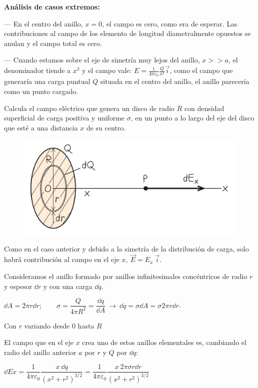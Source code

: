  \textbf{Análisis de casos extremos:}
 
 --- En el centro del anillo, $x=0$, el campo es cero, como era de esperar. Las contribuciones al campo de los elemento de longitud diametralmente opuestos se anulan y el campo total es cero.
 
 --- Cuando estamos sobre el eje de simetría muy lejos del anillo, $x>>a$, el denominador tiende a $x^3$ y el campo vale: 
 $E= \frac{1}{4\pi \varepsilon_0} \frac Q {x^2}\vec i$,
 como el campo que generaría una carga puntual $Q$ situada en el centro del anillo, el anillo parecería como un punto cargado.

\begin{prob}
Calcula el campo eléctrico que genera un disco de radio $R$	con densidad superficial de carga positiva y uniforme $\sigma$, en un punto a lo largo del eje del disco que esté a una distancia $x$ de su centro.
\begin{figure}[H]
	\centering
	\includegraphics[width=.9\textwidth]{imagenes/imagenes22/T22IM22.png}
\end{figure}
\end{prob}

Como en el caso anterior y debido a la simetría de la distribución de carga, solo habrá contribución al campo en el eje $x,\ \vec E=E_x\ \vec i$.

Consideramos el anillo formado por anillos infinitesimales concéntricos de radio $r$ y espesor $\dd r$ y con una carga $\dd q$.

$\dd A= 2\pi r \dd r; \qquad \sigma=\dfrac Q{4\pi R^2}=\dfrac{\dd q}{\dd A} \ \to \ \dd q= \sigma \dd A=\sigma 2 \pi r \dd r$. 

Con $r$ variando desde $0$ hasta $R$

El campo que en el eje $x$ crea uno de estos anillos elementales es,  cambiando el radio del anillo anterior $a$ por $r$ y $Q$ por $\dd q$:

$\dd Ex=\dfrac{1}{4\pi \varepsilon_0} \dfrac{x\ \dd q}{(x^2+r^2)^{3/2}}=
\dfrac{1}{4\pi \varepsilon_0} \dfrac{x \ 2\pi \sigma r \dd r}{(x^2+r^2)^{3/2}}$


